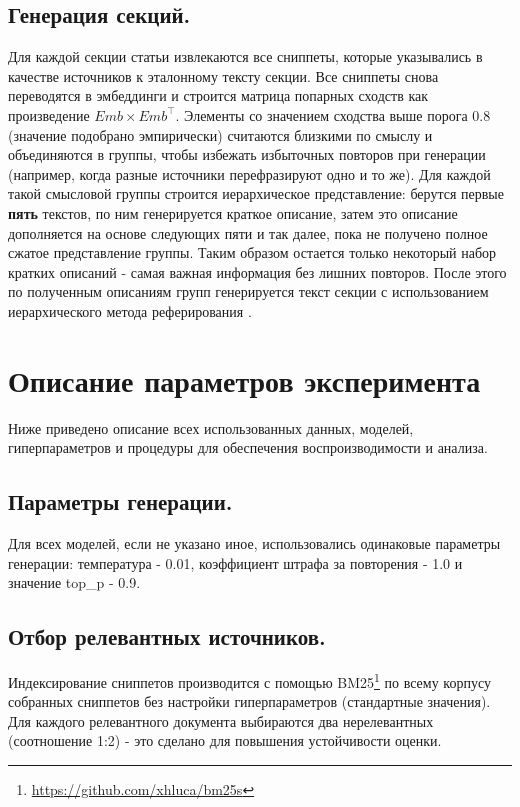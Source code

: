\documentclass{article}
\begin{document}
\subsection*{Генерация секций.}
Для каждой секции статьи извлекаются все сниппеты, которые указывались в качестве источников к эталонному тексту секции. 
Все сниппеты снова переводятся в эмбеддинги и строится матрица попарных сходств как произведение \(Emb \times Emb^\top\).
Элементы со значением сходства выше порога 0.8 (значение подобрано эмпирически) считаются близкими по смыслу и объединяются в группы, 
чтобы избежать избыточных повторов при генерации (например, когда разные источники перефразируют одно и то же). 
Для каждой такой смысловой группы строится иерархическое представление: 
берутся первые \textbf{пять} текстов, по ним генерируется краткое описание, затем это описание дополняется на основе следующих пяти и так далее, пока не получено полное сжатое представление группы.
Таким образом остается только некоторый набор кратких описаний - самая важная информация без лишних повторов.
После этого по полученным описаниям групп генерируется текст секции с использованием иерархического метода реферирования \cite{hier}.

\section*{Описание параметров эксперимента}
Ниже приведено описание всех использованных данных, моделей, гиперпараметров и процедуры для обеспечения воспроизводимости и анализа.

\subsection*{Параметры генерации.}
Для всех моделей, если не указано иное, использовались одинаковые параметры генерации: температура - 0.01, коэффициент штрафа за повторения - 1.0 и значение top\_p - 0.9.

\subsection*{Отбор релевантных источников.}
Индексирование сниппетов производится с помощью BM25\footnote{\url{https://github.com/xhluca/bm25s}} по всему корпусу собранных сниппетов без настройки гиперпараметров (стандартные значения).
Для каждого релевантного документа выбираются два нерелевантных (соотношение 1:2) - это сделано для повышения устойчивости оценки.
\end{document}
